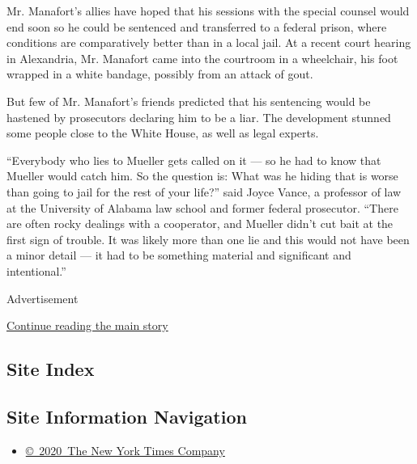 Mr. Manafort's allies have hoped that his sessions with the special
counsel would end soon so he could be sentenced and transferred to a
federal prison, where conditions are comparatively better than in a
local jail. At a recent court hearing in Alexandria, Mr. Manafort came
into the courtroom in a wheelchair, his foot wrapped in a white bandage,
possibly from an attack of gout.

But few of Mr. Manafort's friends predicted that his sentencing would be
hastened by prosecutors declaring him to be a liar. The development
stunned some people close to the White House, as well as legal experts.

``Everybody who lies to Mueller gets called on it --- so he had to know
that Mueller would catch him. So the question is: What was he hiding
that is worse than going to jail for the rest of your life?'' said Joyce
Vance, a professor of law at the University of Alabama law school and
former federal prosecutor. ``There are often rocky dealings with a
cooperator, and Mueller didn't cut bait at the first sign of trouble. It
was likely more than one lie and this would not have been a minor detail
--- it had to be something material and significant and intentional.''

Advertisement

\protect\hyperlink{after-bottom}{Continue reading the main story}

\hypertarget{site-index}{%
\subsection{Site Index}\label{site-index}}

\hypertarget{site-information-navigation}{%
\subsection{Site Information
Navigation}\label{site-information-navigation}}

\begin{itemize}
\tightlist
\item
  \href{https://help.nytimes.com/hc/en-us/articles/115014792127-Copyright-notice}{©~2020~The
  New York Times Company}
\end{itemize}

